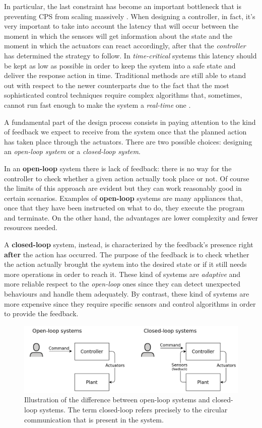 In particular, the last constraint has become an important bottleneck that is preventing CPS from scaling massively \cite{realtimecps}.
When designing a controller, in fact, it's very important to take into account the latency that will occur between the moment in which the sensors will get information about the state and the moment in which the actuators can react accordingly, after that the \textit{controller} has determined the strategy to follow.
In \textit{time-critical} systems this latency should be kept as low as possible in order to keep the system into a safe state and deliver the response action in time.
Traditional methods are still able to stand out with respect to the newer counterparts due to the fact that the most sophisticated control techniques require complex algorithms that, sometimes, cannot run fast enough to make the system a \textit{real-time} one \cite{pidrulez}.

A fundamental part of the design process consists in paying attention to the kind of feedback we expect to receive from the system once that the planned action has taken place through the actuators.
There are two possible choices: designing an \textit{open-loop system} or a \textit{closed-loop system}.

In an \textbf{open-loop} system there is lack of feedback: there is no way for the controller to check whether a given action actually took place or not.
Of course the limits of this approach are evident but they can work reasonably good in certain scenarios.
Examples of \textbf{open-loop} systems are many appliances that, once that they have been instructed on what to do, they execute the program and terminate.
On the other hand, the advantages are lower complexity and fewer resources needed.

A \textbf{closed-loop} system, instead, is characterized by the feedback's presence right \textbf{after} the action has occurred.
The purpose of the feedback is to check whether the action actually brought the system into the desired state or if it still needs more operations in order to reach it.
These kind of systems are \textit{adaptive} and more reliable respect to the \textit{open-loop} ones since they can detect unexpected behaviours and handle them adequately.
By contrast, these kind of systems are more expensive since they require specific sensors and control algorithms in order to provide the feedback.

\begin{figure}[H]
	\centering
	\includegraphics[width=12cm, keepaspectratio]{img/2_1_openclosed_loop.png}
	\caption{Illustration of the difference between open-loop systems and closed-loop systems. The term closed-loop refers precisely to the circular communication that is present in the system.}
\end{figure}

